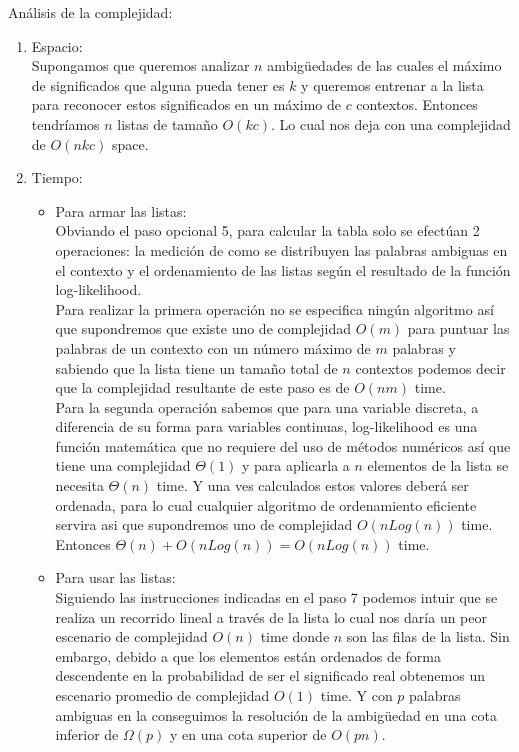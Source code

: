 Análisis de la complejidad:
\begin{enumerate}
    \item Espacio:\\
    Supongamos que queremos analizar $n$ ambigüedades de las cuales el máximo de significados que alguna pueda tener es $k$ y queremos entrenar a la lista para reconocer estos significados en un máximo de $c$ contextos. Entonces tendríamos $n$ listas de tamaño $O(kc)$. Lo cual nos deja con una complejidad de $O(nkc)$ space.
    \item Tiempo:
    \begin{itemize}
        \item Para armar las listas:\\
        Obviando el paso opcional 5, para calcular la tabla solo se efectúan 2 operaciones: la medición de como se distribuyen las palabras ambiguas en el contexto y el ordenamiento de las listas según el resultado de la función log-likelihood.\\Para realizar la primera operación no se especifica ningún algoritmo así que supondremos que existe uno de complejidad $O(m)$ para puntuar las palabras de un contexto con un número máximo de $m$ palabras y sabiendo que la lista tiene un tamaño total de $n$ contextos podemos decir que la complejidad resultante de este paso es de $O(nm)$ time.\\Para la segunda operación sabemos que para una variable discreta, a diferencia de su forma para variables continuas, log-likelihood es una función matemática que no requiere del uso de métodos numéricos así que tiene una complejidad $\Theta(1)$ y para aplicarla a $n$ elementos de la lista se necesita $\Theta(n)$ time. Y una ves calculados estos valores deberá ser ordenada, para lo cual cualquier algoritmo de ordenamiento eficiente servira asi que supondremos uno de complejidad $O(nLog(n))$ time. Entonces $\Theta(n)+O(nLog(n))=O(nLog(n))$ time.
        \item Para usar las listas:\\
        Siguiendo las instrucciones indicadas en el paso 7 podemos intuir que se realiza un recorrido lineal a través de la lista lo cual nos daría un peor escenario de complejidad $O(n)$ time donde $n$ son las filas de la lista. Sin embargo, debido a que los elementos están ordenados de forma descendente en la probabilidad de ser el significado real obtenemos un escenario promedio de complejidad $O(1)$ time. Y con $p$ palabras ambiguas en la conseguimos la resolución de la ambigüedad en una cota inferior de $\Omega(p)$ y en una cota superior de $O(pn)$.
    \end{itemize}
\end{enumerate}